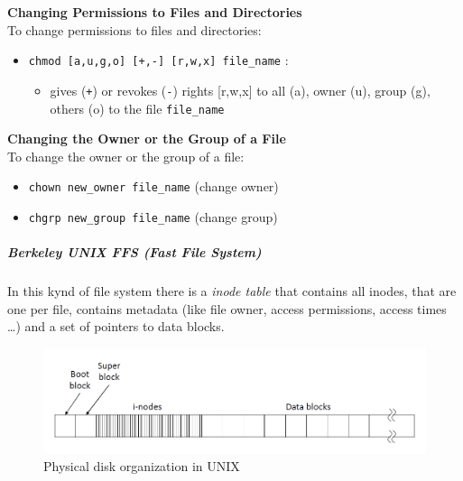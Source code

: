 \documentclass{article}
\begin{document}
                            \textbf{Changing Permissions to Files and Directories}\\
                            
                            To change permissions to files and directories:
                            \begin{itemize}
                                \item \texttt{chmod [a,u,g,o] [+,-] [r,w,x] file\_name} :
                                \begin{itemize}
                                    \item gives (\texttt{+}) or revokes (\texttt{-}) rights [r,w,x] to all (a), owner (u), group (g), others (o) to the file \texttt{file\_name}
                                \end{itemize}
                            \end{itemize}
                            
                            \textbf{Changing the Owner or the Group of a File}\\
                            
                            To change the owner or the group of a file:
                            \begin{itemize}
                                \item \texttt{chown new\_owner file\_name} (change owner)
                                \item \texttt{chgrp new\_group file\_name} (change group)
                            \end{itemize}

                            \subparagraph{Berkeley UNIX FFS (Fast File System)} In this kynd of file system there is a \textit{inode table} that contains all i\-nodes, that are one per file, contains metadata (like file owner, access permissions, access times \dots) and a set of pointers to data blocks.  

                            \begin{figure}
                                \begin{center}
                                    \includegraphics[scale=0.6]{../immagini/physicale_disk.png}
                                \end{center}
                                \caption{Physical disk organization in UNIX }
                            \end{figure}
\end{document}
